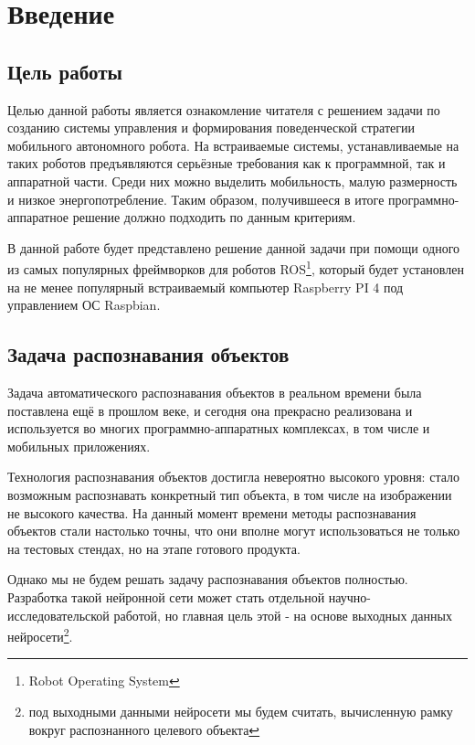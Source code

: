 \documentclass[14pt,a4paper]{scrartcl}
\begin{document}
\tableofcontents
\newpage

\section{Введение}

	\subsection{Цель работы}
	
		Целью данной работы является ознакомление читателя с решением задачи по созданию системы управления и формирования поведенческой стратегии мобильного автономного робота. На встраиваемые системы, устанавливаемые на таких роботов предъявляются серьёзные требования как к программной, так и аппаратной части. Среди них можно выделить мобильность, малую размерность и низкое энергопотребление. Таким образом, получившееся в итоге программно-аппаратное решение должно подходить по данным критериям.
		
		В данной работе будет представлено решение данной задачи при помощи одного из самых популярных фреймворков для роботов ROS\footnote{Robot Operating System}, который будет установлен на не менее популярный встраиваемый компьютер Raspberry PI 4 под управлением ОС Raspbian.
		
		\subsection{Задача распознавания объектов}
		
			Задача автоматического распознавания объектов в реальном времени была поставлена ещё в прошлом веке, и сегодня она прекрасно реализована и используется во многих программно-аппаратных комплексах, в том числе и мобильных приложениях.
			
			Технология распознавания объектов достигла невероятно высокого уровня: стало возможным распознавать конкретный тип объекта, в том числе на изображении не высокого качества. На данный момент времени методы распознавания объектов стали настолько точны, что они вполне могут использоваться не только на тестовых стендах, но на этапе готового продукта. %
			
			Однако мы не будем решать задачу распознавания объектов полностью. Разработка такой нейронной сети может стать отдельной научно-исследовательской работой, но главная цель этой - на основе выходных данных нейросети\footnote{под выходными данными нейросети мы будем считать, вычисленную рамку вокруг распознанного целевого объекта}.
			
\end{document}
